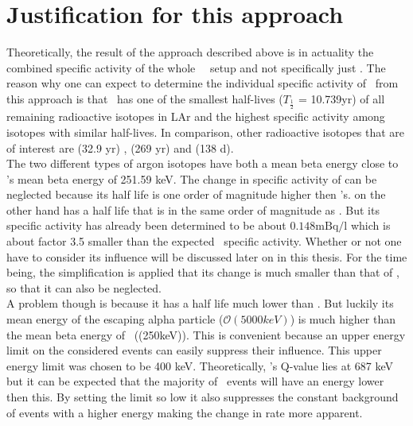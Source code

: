 \documentclass[encoding=utf8,british]{tumphthesis}
\begin{document}
\section{Justification for this approach}

Theoretically, the result of the approach described above is in actuality the combined specific activity of the whole \gerda\ \PII\ setup and not specifically just \Kr.
The reason why one can expect to determine the individual specific activity of \Kr\ from this approach is that \Kr\ has one of the smallest half-lives ($T_{\frac{1}{2}}$ = 10.739\unit{yr}) of all remaining radioactive isotopes in LAr and the highest specific activity among isotopes with similar half-lives. 
In comparison, other radioactive isotopes that are of interest are  (32.9 yr) \cite{chen_nuclear_2016},  (269 yr) \cite{singh_nuclear_2006} and  (138 d)\cite{kondev_nuclear_2008}.
\\

The two different types of argon isotopes have both a mean beta energy close to \Kr's mean beta energy of  251.59 keV.
The change in specific activity of  can be neglected because its half life is one order of magnitude higher then \Kr's.
 on the other hand has a half life that is in the same order of magnitude as \Kr.
But its specific activity has already been determined to be about $0.148\mathrm{mBq/l}$ \cite{becerici_schmidt_results_2014} which is about factor 3.5 smaller than the expected \Kr\ specific activity.
Whether or not one have to consider its influence will be discussed later on in this thesis.
For the time being, the simplification is applied that its change is much smaller than that of \Kr, so that it can also be neglected.
\\

A problem though is because it has a half life  much lower than \Kr.
But luckily its mean energy of the escaping alpha particle ($\mathcal{O}(5000\unit{keV})$) is much higher than the mean beta energy of \Kr\ ((250\unit{keV})).
This is convenient because an upper energy limit on the considered events can easily suppress their influence.
This upper energy limit was chosen to be 400 keV.
Theoretically, \Kr's Q-value lies at 687 keV but it can be expected that the majority of \Kr\ events will have an energy lower then this.
By setting the limit so low it also suppresses the constant background of events with a higher energy making the change in rate more apparent.
\\
\end{document}
